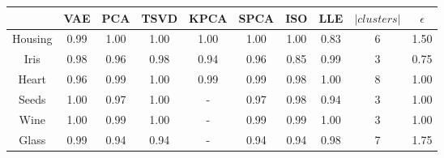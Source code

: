 \begin{tabular}{c|ccccccc|c|c}
          & \textbf{VAE} & \textbf{PCA} & \textbf{TSVD} & \textbf{KPCA} & \textbf{SPCA} & \textbf{ISO} & \textbf{LLE} & $|clusters|$ & $\epsilon$ \\
   
  \hline
  
  Housing & 0.99         & 1.00         & 1.00          & 1.00          & 1.00          & 1.00         & 0.83         & 6            & 1.50       \\
  Iris    & 0.98         & 0.96         & 0.98          & 0.94          & 0.96          & 0.85         & 0.99         & 3            & 0.75       \\
  Heart   & 0.96         & 0.99         & 1.00          & 0.99          & 0.99          & 0.98         & 1.00         & 8            & 1.00       \\
  Seeds   & 1.00         & 0.97         & 1.00          & -             & 0.97          & 0.98         & 0.94         & 3            & 1.00       \\
  Wine    & 1.00         & 0.99         & 1.00          & -             & 0.99          & 0.99         & 1.00         & 3            & 1.00       \\
  Glass   & 0.99         & 0.94         & 0.94          & -             & 0.94          & 0.94         & 0.98         & 7            & 1.75       \\
\end{tabular}